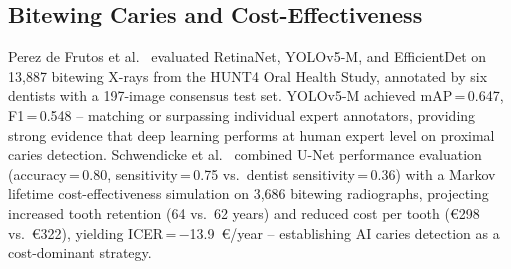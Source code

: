 \documentclass[conference]{IEEEtran}
\begin{document}
\subsection{Bitewing Caries and Cost-Effectiveness}

Perez de Frutos et al.~\cite{perez2024ai} evaluated RetinaNet,
YOLOv5-M, and EfficientDet on 13,887 bitewing X-rays from the HUNT4
Oral Health Study, annotated by six dentists with a 197-image consensus
test set. YOLOv5-M achieved mAP\,=\,0.647, F1\,=\,0.548 -- matching or
surpassing individual expert annotators, providing strong evidence that
deep learning performs at human expert level on proximal caries
detection. Schwendicke et al.~\cite{schwendicke2021cost} combined U-Net
performance evaluation (accuracy\,=\,0.80, sensitivity\,=\,0.75 vs.\
dentist sensitivity\,=\,0.36) with a Markov lifetime cost-effectiveness
simulation on 3,686 bitewing radiographs, projecting increased tooth
retention (64 vs.\ 62 years) and reduced cost per tooth
(\euro298 vs.\ \euro322), yielding ICER\,=\,$-$13.9~\euro/year --
establishing AI caries detection as a cost-dominant strategy.
\end{document}
